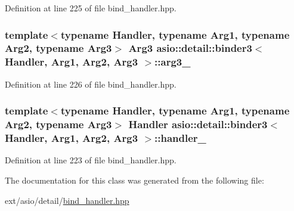 Definition at line 225 of file bind\+\_\+handler.\+hpp.

\hypertarget{classasio_1_1detail_1_1binder3_af73059f968a08758b444c1b9260aa24a}{}
\subsubsection[{arg3\+\_\+}]{\setlength{\rightskip}{0pt plus 5cm}template$<$typename Handler, typename Arg1, typename Arg2, typename Arg3$>$ Arg3 {\bf asio\+::detail\+::binder3}$<$ Handler, Arg1, Arg2, Arg3 $>$\+::arg3\+\_\+}\label{classasio_1_1detail_1_1binder3_af73059f968a08758b444c1b9260aa24a}


Definition at line 226 of file bind\+\_\+handler.\+hpp.

\hypertarget{classasio_1_1detail_1_1binder3_a7f163de06caa7421ffc36ba2f3a2c26b}{}
\subsubsection[{handler\+\_\+}]{\setlength{\rightskip}{0pt plus 5cm}template$<$typename Handler, typename Arg1, typename Arg2, typename Arg3$>$ Handler {\bf asio\+::detail\+::binder3}$<$ Handler, Arg1, Arg2, Arg3 $>$\+::handler\+\_\+}\label{classasio_1_1detail_1_1binder3_a7f163de06caa7421ffc36ba2f3a2c26b}


Definition at line 223 of file bind\+\_\+handler.\+hpp.



The documentation for this class was generated from the following file\+:\begin{DoxyCompactItemize}
\item 
ext/asio/detail/\hyperlink{bind__handler_8hpp}{bind\+\_\+handler.\+hpp}\end{DoxyCompactItemize}
